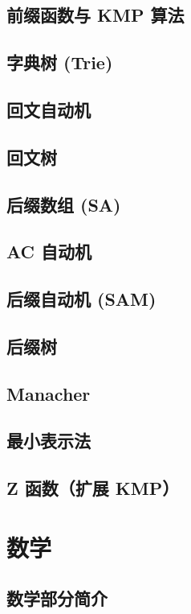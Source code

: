 \section{前缀函数与 KMP 算法}

\section{字典树 (Trie)}

\section{回文自动机}

\section{回文树}

\section{后缀数组 (SA)}

\section{AC 自动机}

\section{后缀自动机 (SAM)}

\section{后缀树}

\section{Manacher}

\section{最小表示法}

\section{Z 函数（扩展 KMP）}

\chapter{数学}
\section{数学部分简介}

